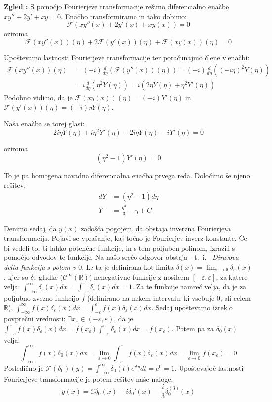 \documentclass[a4paper, 10pt]{article}
\newcounter{zgledcount}
\newenvironment{zgled}{\begin{flushleft}\refstepcounter{zgledcount}\textbf{Zgled \arabic{zgledcount}:}}{\hfill\end{flushleft}}
\newcommand{\mth}[1]{\ensuremath{\mathbb{#1}}}
\newcommand{\R}{\mth{R}}
\newcommand{\pojem}[1]{\emph{#1}}
\begin{document}
		\begin{zgled}
			\label{zgl:DEFT1}
			S pomočjo Fourierjeve transformacije rešimo diferencialno enačbo $xy'' + 2y' + xy = 0$. Enačbo transformiramo in tako dobimo: $$\mathcal{F}(xy''(x) + 2y'(x) + xy(x)) = 0$$ oziroma $$\mathcal{F}(xy''(x))(\eta) + 2\mathcal{F}(y'(x))(\eta) + \mathcal{F}(xy(x))(\eta) = 0$$
			
			Upoštevamo lastnosti Fourierjeve transformacije ter poračunajmo člene v enačbi: \begin{align*}
				\mathcal{F}(xy''(x))(\eta) &= (-i)\frac{d}{d\eta}(\mathcal{F}(y''(x))(\eta)) = (-i)\frac{d}{d\eta}((-i\eta)^2Y(\eta)) \\
				&= i\frac{d}{d\eta}(\eta^2Y(\eta)) = i(2\eta Y(\eta) + \eta^2Y'(\eta))
			\end{align*}
			Podobno vidimo, da je $\mathcal{F}(xy(x))(\eta) = (-i)Y'(\eta)$ in $\mathcal{F}(y'(x))(\eta) = (-i)\eta Y(\eta)$.
			
			Naša enačba se torej glasi: $$
				2i\eta Y(\eta) + i\eta^2 Y'(\eta) - 2i\eta Y(\eta) -iY'(\eta) = 0
			$$
			
			oziroma
			$$
			(\eta^2 - 1)Y'(\eta) = 0
			$$
			
			To je pa homogena navadna diferencialna enačba prvega reda. Določimo še njeno rešitev: 
			\begin{align*}
				dY &= (\eta^2 - 1)d\eta \\
				Y & = \frac{\eta^3}{3} - \eta + C
			\end{align*}
			
			Denimo sedaj, da $y(x)$ zadošča pogojem, da obstaja inverzna Fourierjeva transformacija. Pojavi se vprašanje, kaj točno je Fourierjev inverz konstante. Če bi vedeli to, bi lahko potenčne funkcije, in s tem poljuben polinom, izrazili s pomočjo odvodov te funkcije. Na našo srečo odgovor obstaja - t.~i.~ \pojem{Diracova delta funkcija s polom v $0$}. Le ta je definirana kot limita $\delta(x) = \lim_{\varepsilon\to 0}\delta_\varepsilon(x)$, kjer so $\delta_\varepsilon$ gladke ($\mathcal{C}^{\infty}(\R)$) nenegativne funkcije z nosilcem $[-\varepsilon, \varepsilon]$, za katere velja: $\int_{-\infty}^{\infty}\delta_\varepsilon(x)dx = \int_{-\varepsilon}^{\varepsilon}\delta_\varepsilon(x)dx = 1$. Za te funkcije namreč velja, da je za poljubno zvezno funkcijo $f$ (definirano na nekem intervalu, ki vsebuje $0$, ali celem $\R$), $\int_{-\infty}^{\infty}f(x)\delta_\varepsilon(x)dx = \int_{-\varepsilon}^{\varepsilon}f(x)\delta_\varepsilon(x)dx$. Sedaj upoštevamo izrek o povprečni vrednosti: $\exists x_\varepsilon \in (-\varepsilon, \varepsilon)$, da je $\int_{-\varepsilon}^{\varepsilon}f(x)\delta_\varepsilon(x)dx = f(x_\varepsilon)\int_{-\varepsilon}^{\varepsilon}\delta_\varepsilon(x)dx = f(x_\varepsilon)$. Potem pa za $\delta_0(x)$ velja: $$\int_{-\infty}^{\infty}f(x)\delta_{0}(x)dx = \lim_{\varepsilon\to 0}\int_{-\varepsilon}^{\varepsilon}f(x)\delta_{\varepsilon}(x)dx = \lim_{\varepsilon\to 0}f(x_\varepsilon) = 0$$
			Posledično je $\mathcal{F}(\delta_{0})(y) = \int_{-\infty}^{\infty}\delta_{0}(t)e^{ity}dt = e^{0} = 1$. Upoštevajoč lastnosti Fourierjeve transformacije je potem rešitev naše naloge:
			$$y(x) = C\delta_0(x) - i\delta_0'(x) - \frac{i}{3}\delta_0^{(3)}(x)$$
		\end{zgled}
		
\end{document}
